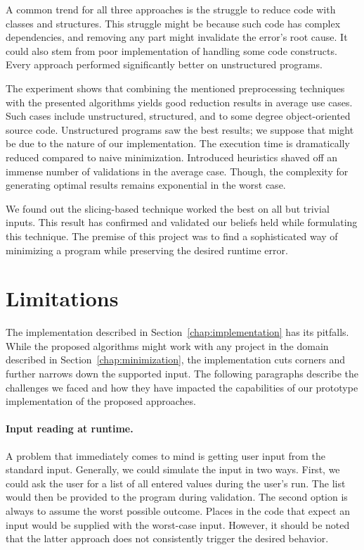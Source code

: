 A common trend for all three approaches is the struggle to reduce code with 
classes and structures. 
This struggle might be because such code has complex dependencies, and 
removing any part might invalidate the error's root cause. 
It could also stem from poor implementation of handling some code constructs.
Every approach performed significantly better on unstructured programs.

The experiment shows that combining the mentioned preprocessing techniques 
with the presented algorithms yields good reduction results in average use 
cases. 
Such cases include unstructured, structured, and to some degree 
object-oriented source code. 
Unstructured programs saw the best results; we suppose that might be due to 
the nature of our implementation. 
The execution time is dramatically reduced compared to naive minimization. 
Introduced heuristics shaved off an immense number of validations in 
the average case. 
Though, the complexity for generating optimal results remains exponential in 
the worst case.

We found out the slicing-based technique worked the best on all but trivial 
inputs. 
This result has confirmed and validated our beliefs held while formulating 
this technique.
The premise of this project was to find a sophisticated way of minimizing 
a program while preserving the desired runtime error. 

\section{Limitations}\label{chap:limitations}

The implementation described in Section~\ref{chap:implementation} has its 
pitfalls. 
While the proposed algorithms might work with any project in the domain 
described in Section~\ref{chap:minimization}, the implementation cuts corners 
and further narrows down the supported input. 
The following paragraphs describe the challenges we faced and how they have 
impacted the capabilities of our prototype implementation of the proposed 
approaches.

\paragraph{Input reading at runtime.}
A problem that immediately comes to mind is getting user input from 
the standard input. 
Generally, we could simulate the input in two ways. 
First, we could ask the user for a list of all entered values during 
the user's run. 
The list would then be provided to the program during validation. 
The second option is always to assume the worst possible outcome. 
Places in the code that expect an input would be supplied with 
the worst-case input. 
However, it should be noted that the latter approach does not consistently 
trigger the desired behavior.

